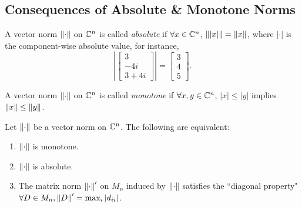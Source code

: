 \subsection{Consequences of Absolute \& Monotone Norms}
\begin{definition}
\label{def:absolute-vector-norm}
A vector norm $\left\lVert\cdot\right\rVert$ on $\mathbb C^n$ is called \textit{absolute} if
$\forall x \in \mathbb C^n$, $\left\lVert|x|\right\rVert = \left\lVert x\right\rVert$, where $|\cdot|$ is the component-wise absolute value, for instance,
\[
\left|\begin{bmatrix}3 \\ -4i \\ 3 + 4i \end{bmatrix}\right| = \begin{bmatrix}3 \\ 4 \\ 5\end{bmatrix}.
\]
\end{definition}

\begin{definition}
\label{def:monotone-vector-norm}
A vector norm $\left\lVert\cdot\right\rVert$ on $\mathbb C^n$ is called \textit{monotone} if
$\forall x,y \in \mathbb C^n$, $|x|\le |y|$ implies $\left\lVert x\right\rVert \le \left\lVert y\right\rVert$.
\end{definition}

\begin{theorem}
\label{thm:monotone-absolute-equivalencies}
Let $\left\lVert\cdot\right\rVert$ be a vector norm on $\mathbb C^n$. The following are equivalent:
\begin{enumerate}
    \item $\left\lVert\cdot\right\rVert$ is monotone.
    \item $\left\lVert\cdot\right\rVert$ is absolute.
    \item The matrix norm $\left\lVert\cdot\right\rVert'$ on $M_n$ induced by $\left\lVert\cdot\right\rVert$ satisfies the ``diagonal property" $\forall D \in M_n, \left\lVert D\right\rVert' = \max_i |d_{ii}|$.
\end{enumerate}
\end{theorem}

